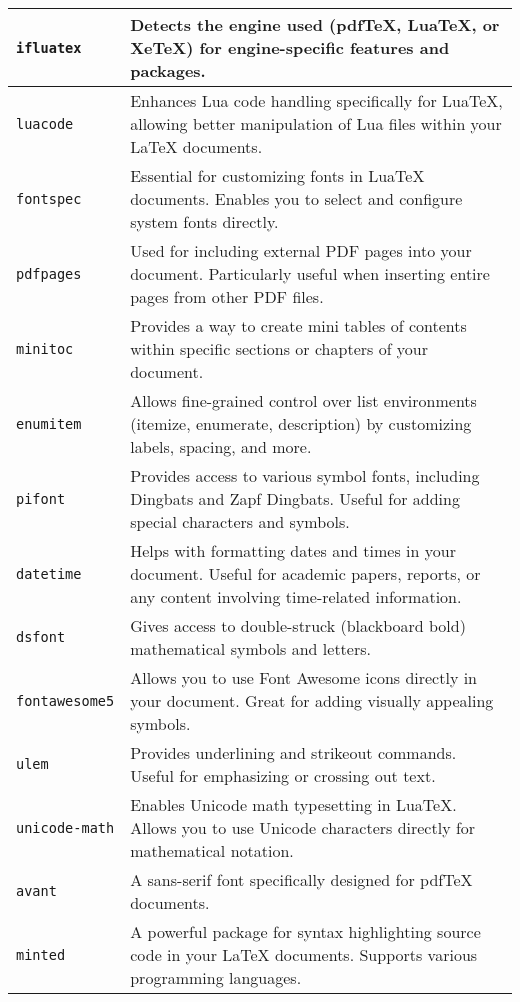 \pagebreak

\noindent\begin{tabularx}{\linewidth}{|X|X|}
    \hline
    \texttt{ifluatex}     & Detects the engine used (pdfTeX, LuaTeX, or XeTeX) for engine-specific features and packages. \\
    \hline
    \texttt{luacode}      & Enhances Lua code handling specifically for LuaTeX, allowing better manipulation of Lua files within your LaTeX documents. \\
    \hline
    \texttt{fontspec}     & Essential for customizing fonts in LuaTeX documents. Enables you to select and configure system fonts directly. \\
    \hline
    \texttt{pdfpages}     & Used for including external PDF pages into your document. Particularly useful when inserting entire pages from other PDF files. \\
    \hline
    \texttt{minitoc}      & Provides a way to create mini tables of contents within specific sections or chapters of your document. \\
    \hline
    \texttt{enumitem}     & Allows fine-grained control over list environments (itemize, enumerate, description) by customizing labels, spacing, and more. \\
    \hline
    \texttt{pifont}       & Provides access to various symbol fonts, including Dingbats and Zapf Dingbats. Useful for adding special characters and symbols. \\
    \hline
    \texttt{datetime}     & Helps with formatting dates and times in your document. Useful for academic papers, reports, or any content involving time-related information. \\
    \hline
    \texttt{dsfont}       & Gives access to double-struck (blackboard bold) mathematical symbols and letters. \\
    \hline
    \texttt{fontawesome5} & Allows you to use Font Awesome icons directly in your document. Great for adding visually appealing symbols. \\
    \hline
    \texttt{ulem}         & Provides underlining and strikeout commands. Useful for emphasizing or crossing out text. \\
    \hline
    \texttt{unicode-math} & Enables Unicode math typesetting in LuaTeX. Allows you to use Unicode characters directly for mathematical notation. \\
    \hline
    \texttt{avant}        & A sans-serif font specifically designed for pdfTeX documents. \\
    \hline
    \texttt{minted}       & A powerful package for syntax highlighting source code in your LaTeX documents. Supports various programming languages. \\
    \bottomrule
\end{tabularx}
